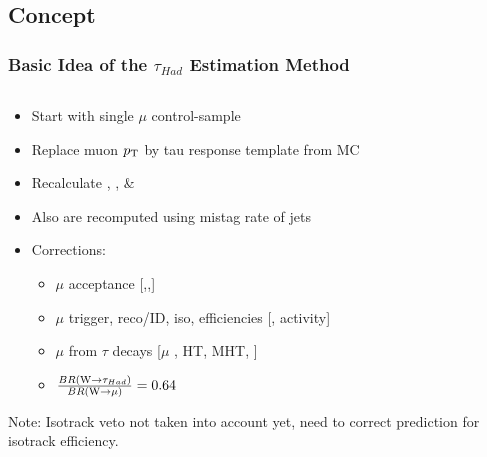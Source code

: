 \documentclass{beamer}
\begin{document}
\subsection{Concept}
\begin{frame}
 \frametitle{Basic Idea of the $\tau_{Had}$ Estimation Method}
 
    \begin{columns}
        \begin{column}{0.60\textwidth}
        \begin{itemize}
         \item Start with single $\mu$ control-sample
         \item Replace muon $p_{\text{T}}$ by tau response template from MC
         \item Recalculate \HT, \MHT, \NJets \& \met
         \item Also \BTags are recomputed using mistag rate of \hadtau jets
         \item Corrections:
         \begin{itemize}
          \item $\mu$ acceptance [\HT,\MHT,\NJets]
          \item $\mu$ trigger, reco/ID, iso, efficiencies [\pt, activity]
          \item $\mu$ from $\tau$ decays [$\mu$ \pt, HT, MHT, \NJets]
          \item $\frac{BR(\text{W}\rightarrow\tau_{Had})}{BR(\text{W}\rightarrow\mu)}=0.64$
         \end{itemize}

        \end{itemize}
        Note: Isotrack veto not taken into account yet, need to correct prediction for isotrack efficiency.
        

        
    

\end{column}
\end{columns}
\end{frame}
\end{document}
